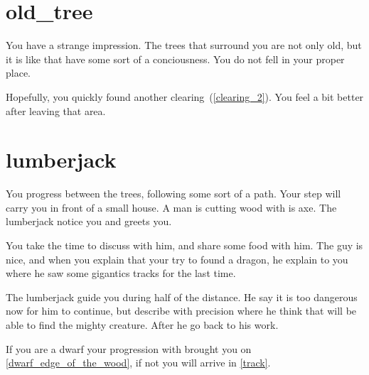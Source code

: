 \section{old_tree}

You have a strange impression. The trees that surround you are not only old, but
it is like that have some sort of a conciousness. You do not fell in your proper
place.

Hopefully, you quickly found another clearing~(\ref{clearing_2}). You feel a bit
better after leaving that area.

\section{lumberjack}

You progress between the trees, following some sort of a path. Your step will
carry you in front of a small house. A man is cutting wood with is axe. The
lumberjack notice you and greets you.

You take the time to discuss with him, and share some food with him. The guy is
nice, and when you explain that your try to found a dragon, he explain to you
where he saw some gigantics tracks for the last time.

The lumberjack guide you during half of the distance. He say it is too dangerous
now for him to continue, but describe with precision where he think that will be
able to find the mighty creature. After he go back to his work.

If you are a dwarf your progression with brought you on
\ref{dwarf_edge_of_the_wood}, if not you will arrive in \ref{track}.
